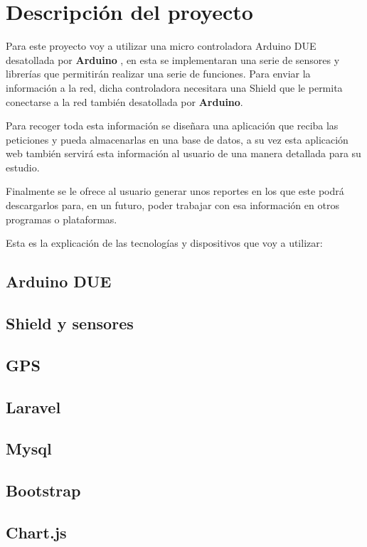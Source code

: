 
\chapter{Descripción del proyecto}

Para este proyecto voy a utilizar una micro controladora Arduino DUE desatollada por \textbf{Arduino} , en esta se implementaran una serie de sensores y librerías que permitirán realizar una serie de funciones. Para enviar la información a la red, dicha controladora necesitara una Shield que le permita conectarse a la red también desatollada por \textbf{Arduino}.

Para recoger toda esta información se diseñara una aplicación que reciba las peticiones y pueda almacenarlas en una base de datos, a su vez esta aplicación web también servirá esta información al usuario de una manera detallada para su estudio.

Finalmente se le ofrece al usuario generar unos reportes en los que este podrá descargarlos para, en un futuro, poder trabajar con esa información en otros programas o plataformas.

Esta es la explicación de las tecnologías y dispositivos que voy a utilizar:

\section{Arduino DUE}
\section{Shield y sensores}
\section{GPS}
\section{Laravel}
\section{Mysql}
\section{Bootstrap}
\section{Chart.js}